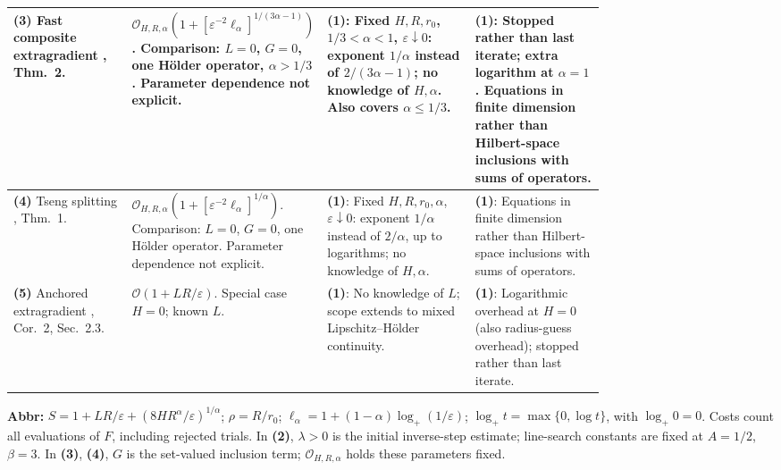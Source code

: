 \begin{table}[tp]
\begin{threeparttable}
\begin{tabularx}{\linewidth}{@{}>{\raggedright\arraybackslash}p{0.20\linewidth}>{\raggedright\arraybackslash}p{0.32\linewidth}>{\raggedright\arraybackslash}p{0.25\linewidth}>{\raggedright\arraybackslash}X@{}}
\midrule
\textbf{(3)} Fast composite extragradient \citep{hmZhang2026v1}, Thm.~2.
& $\mathcal{O}_{H,R,\alpha}\!\left(1+[\varepsilon^{-2}\ell_\alpha]^{1/(3\alpha-1)}\right)$.
Comparison: $L=0$, $G=0$, one H\"older operator, $\alpha>1/3$. Parameter dependence not explicit.
& \textbf{(1)}: Fixed $H,R,r_0$, $1/3<\alpha<1$, $\varepsilon\downarrow0$: exponent $1/\alpha$ instead of $2/(3\alpha-1)$; no knowledge of $H,\alpha$. Also covers $\alpha\le1/3$.
& \textbf{(1)}: Stopped rather than last iterate; extra logarithm at $\alpha=1$. Equations in finite dimension rather than Hilbert-space inclusions with sums of operators. \\
\midrule
\textbf{(4)} Tseng splitting \citep{hmZhang2026v1}, Thm.~1.
& $\mathcal{O}_{H,R,\alpha}\!\left(1+[\varepsilon^{-2}\ell_\alpha]^{1/\alpha}\right)$.
Comparison: $L=0$, $G=0$, one H\"older operator. Parameter dependence not explicit.
& \textbf{(1)}: Fixed $H,R,r_0,\alpha$, $\varepsilon\downarrow0$: exponent $1/\alpha$ instead of $2/\alpha$, up to logarithms; no knowledge of $H,\alpha$.
& \textbf{(1)}: Equations in finite dimension rather than Hilbert-space inclusions with sums of operators. \\
\midrule
\textbf{(5)} Anchored extragradient \citep{bscYoonRyu2021}, Cor.~2, Sec.~2.3.
& $\mathcal{O}(1+LR/\varepsilon)$. Special case $H=0$; known $L$.
& \textbf{(1)}: No knowledge of $L$; scope extends to mixed Lipschitz--H\"older continuity.
& \textbf{(1)}: Logarithmic overhead at $H=0$ (also radius-guess overhead); stopped rather than last iterate. \\
\bottomrule
\end{tabularx}
\begin{tablenotes}[flushleft]\footnotesize
\item[] \textbf{Abbr:} $S=1+LR/\varepsilon+(8HR^\alpha/\varepsilon)^{1/\alpha}$; $\rho=R/r_0$; $\ell_\alpha=1+(1-\alpha)\log_+(1/\varepsilon)$; $\log_+t=\max\{0,\log t\}$, with $\log_+0=0$. Costs count all evaluations of $F$, including rejected trials. In \textbf{(2)}, $\lambda>0$ is the initial inverse-step estimate; line-search constants are fixed at $A=1/2$, $\beta=3$. In \textbf{(3)}, \textbf{(4)}, $G$ is the set-valued inclusion term; $\mathcal{O}_{H,R,\alpha}$ holds these parameters fixed.
\end{tablenotes}
\end{threeparttable}
\end{table}
\clearpage

